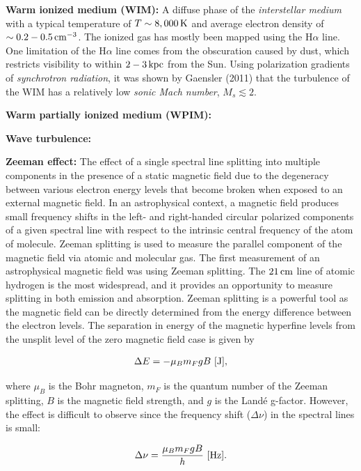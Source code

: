 \documentclass[a4paper,11pt]{article}
\begin{document}
{\noindent}\textbf{Warm ionized medium (WIM):} A diffuse phase of the \textit{interstellar medium} with a typical temperature of $T\sim8,000\,{\rm K}$ and average electron density of $\sim0.2-0.5\,{\rm cm^{-3}}$. The ionized gas has mostly been mapped using the H$\alpha$ line. One limitation of the H$\alpha$ line comes from the obscuration caused by dust, which restricts visibility to within $2-3\,{\rm kpc}$ from the Sun. Using polarization gradients of \textit{synchrotron radiation}, it was shown by Gaensler (2011) that the turbulence of the WIM has a relatively low \textit{sonic Mach number}, $M_s\lesssim2$.

{\noindent}\textbf{Warm partially ionized medium (WPIM):}

{\noindent}\textbf{Wave turbulence:}

{\noindent}\textbf{Zeeman effect:} The effect of a single spectral line splitting into multiple components in the presence of a static magnetic field due to the degeneracy between various electron energy levels that become broken when exposed to an external magnetic field. In an astrophysical context, a magnetic field produces small frequency shifts in the left- and right-handed circular polarized components of a given spectral line with respect to the intrinsic central frequency of the atom of molecule. Zeeman splitting is used to measure the parallel component of the magnetic field via atomic and molecular gas. The first measurement of an astrophysical magnetic field was using Zeeman splitting. The $21\,{\rm cm}$ line of atomic hydrogen is the most widespread, and it provides an opportunity to measure splitting in both emission and absorption. Zeeman splitting is a powerful tool as the magnetic field can be directly determined from the energy difference between the electron levels. The separation in energy of the magnetic hyperfine levels from the unsplit level of the zero magnetic field case is given by

\begin{align*}
    \Delta E = -\mu_Bm_FgB ~ [{\rm J}],
\end{align*}

{\noindent}where $\mu_B$ is the Bohr magneton, $m_F$ is the quantum number of the Zeeman splitting, $B$ is the magnetic field strength, and $g$ is the Land\'e g-factor. However, the effect is difficult to observe since the frequency shift ($\Delta\nu$) in the spectral lines is small:

\begin{align*}
    \Delta\nu = \frac{\mu_Bm_FgB}{h} ~ [{\rm Hz}].
\end{align*}
\end{document}
